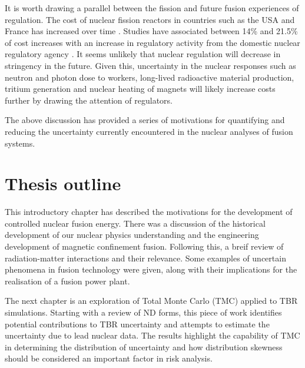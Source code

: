It is worth drawing a parallel between the fission and future fusion experiences of regulation. The cost of nuclear fission reactors in countries such as the USA and France has increased over time \cite{Lovering2016}. Studies have associated between 14\% and 21.5\% of cost increases with an increase in regulatory activity from the domestic nuclear regulatory agency \cite{Cantor1988}. It seems unlikely that nuclear regulation will decrease in stringency in the future. Given this, uncertainty in the nuclear responses such as neutron and photon dose to workers, long-lived radioactive material production, tritium generation and nuclear heating of magnets will likely increase costs further by drawing the attention of regulators.


The above discussion has provided a series of motivations for quantifying and reducing the uncertainty currently encountered in the nuclear analyses of fusion systems.


\section{Thesis outline}
This introductory chapter has described the motivations for the development of controlled nuclear fusion energy. There was a discussion of the historical development of our nuclear physics understanding and the engineering development of magnetic confinement fusion. Following this, a breif review of radiation-matter interactions and their relevance. Some examples of uncertain phenomena in fusion technology were given, along with their implications for the realisation of a fusion power plant. 

The next chapter is an exploration of Total Monte Carlo (TMC)  applied to TBR simulations. Starting with a review of ND forms, this piece of work identifies potential contributions to TBR uncertainty and attempts to estimate the uncertainty due to lead nuclear data. The results highlight the capability of TMC in determining the distribution of uncertainty and how distribution skewness should be considered an important factor in risk analysis.

